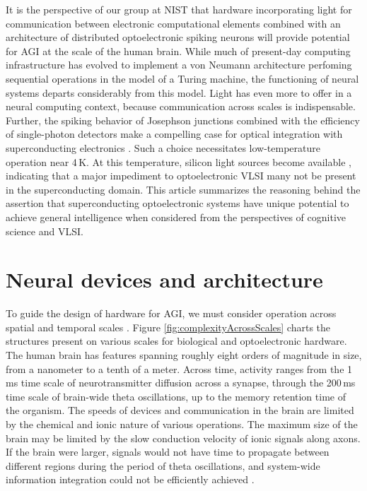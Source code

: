 \documentclass[twocolumn]{article}
\begin{document}
It is the perspective of our group at NIST that hardware incorporating light for communication between electronic computational elements combined with an architecture of distributed optoelectronic spiking neurons will provide potential for AGI at the scale of the human brain. While much of present-day computing infrastructure has evolved to implement a von Neumann architecture perfoming sequential operations in the model of a Turing machine, the functioning of neural systems departs considerably from this model. Light has even more to offer in a neural computing context, because communication across scales is indispensable. Further, the spiking behavior of Josephson junctions combined with the efficiency of single-photon detectors make a compelling case for optical integration with superconducting electronics \cite{shbu2017,sh2018}. Such a choice necessitates low-temperature operation near 4\,K. At this temperature, silicon light sources become available \cite{buch2017}, indicating that a major impediment to optoelectronic VLSI many not be present in the superconducting domain. This article summarizes the reasoning behind the assertion that superconducting optoelectronic systems have unique potential to achieve general intelligence when considered from the perspectives of cognitive science and VLSI.


\section{\label{sec:neuralArchitectureAndDevices}Neural devices and architecture}
To guide the design of hardware for AGI, we must consider operation across spatial and temporal scales \cite{beba2016}. Figure \ref{fig:complexityAcrossScales} charts the structures present on various scales for biological and optoelectronic hardware. The human brain has features spanning roughly eight orders of magnitude in size, from a nanometer to a tenth of a meter. Across time, activity ranges from the 1\,ms time scale of neurotransmitter diffusion across a synapse, through the 200\,ms time scale of brain-wide theta oscillations, up to the memory retention time of the organism. The speeds of devices and communication in the brain are limited by the chemical and ionic nature of various operations. The maximum size of the brain may be limited by the slow conduction velocity of ionic signals along axons. If the brain were larger, signals would not have time to propagate between different regions during the period of theta oscillations, and system-wide information integration could not be efficiently achieved \cite{bu2006,sh2018_ICRC}. 
\end{document}
